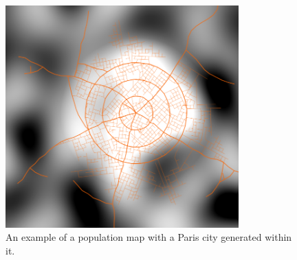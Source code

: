 \begin{figure}[h!]
  \centering

  \includegraphics[width=0.8\textwidth]{figure/pop_density.png}
  \caption{An example of a population map with a Paris city generated within it.}

  \label{fig:population density}
\end{figure}